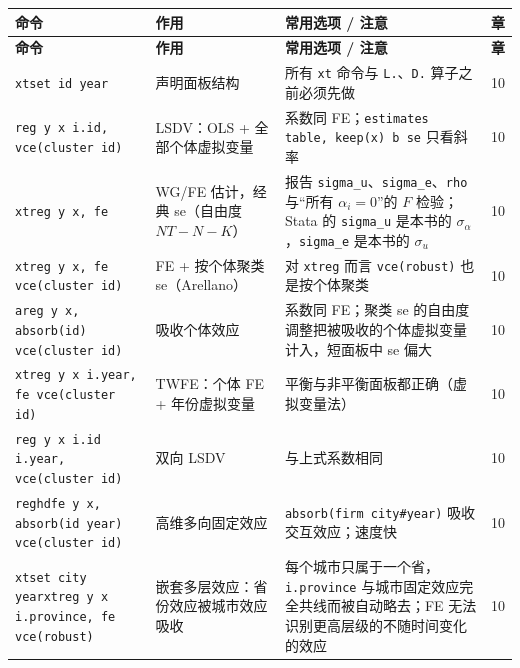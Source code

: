 {\renewcommand{\arraystretch}{1.12}\begin{longtable}{@{}>{\raggedright\arraybackslash\small}p{5.3cm}>{\raggedright\arraybackslash\small}p{3.8cm}>{\raggedright\arraybackslash\small}p{5.3cm}>{\centering\arraybackslash\small}p{0.9cm}@{}}
\toprule
\textbf{命令} & \textbf{作用} & \textbf{常用选项 / 注意} & \textbf{章}\\
\midrule
\endfirsthead
\toprule
\textbf{命令} & \textbf{作用} & \textbf{常用选项 / 注意} & \textbf{章}\\
\midrule
\endhead
\bottomrule
\endlastfoot

\texttt{xtset id year}\newline {\footnotesize\rmfamily [官方]} & 声明面板结构 & 所有 \texttt{xt} 命令与 \texttt{L.}、\texttt{D.} 算子之前必须先做 & 10\\
\addlinespace[1pt]
\texttt{reg y x i.id, vce(cluster id)} & LSDV：OLS + 全部个体虚拟变量 & 系数同 FE；\texttt{estimates table, keep(x) b se} 只看斜率 & 10\\
\addlinespace[1pt]
\texttt{xtreg y x, fe} & WG/FE 估计，经典 se（自由度 $NT-N-K$） & 报告 \texttt{sigma\_u}、\texttt{sigma\_e}、\texttt{rho} 与“所有 $\alpha_i=0$”的 $F$ 检验；Stata 的 \texttt{sigma\_u} 是本书的 $\sigma_\alpha$，\texttt{sigma\_e} 是本书的 $\sigma_u$ & 10\\
\addlinespace[1pt]
\texttt{xtreg y x, fe vce(cluster id)} & FE + 按个体聚类 se（Arellano） & 对 \texttt{xtreg} 而言 \texttt{vce(robust)} 也是按个体聚类 & 10\\
\addlinespace[1pt]
\texttt{areg y x, absorb(id) vce(cluster id)} & 吸收个体效应 & 系数同 FE；聚类 se 的自由度调整把被吸收的个体虚拟变量计入，短面板中 se 偏大 & 10\\
\addlinespace[1pt]
\texttt{xtreg y x i.year, fe vce(cluster id)} & TWFE：个体 FE + 年份虚拟变量 & 平衡与非平衡面板都正确（虚拟变量法） & 10\\
\addlinespace[1pt]
\texttt{reg y x i.id i.year, vce(cluster id)} & 双向 LSDV & 与上式系数相同 & 10\\
\addlinespace[1pt]
\texttt{reghdfe y x, absorb(id year) vce(cluster id)}\newline {\footnotesize\rmfamily [SSC]} & 高维多向固定效应 & \texttt{absorb(firm city\#year)} 吸收交互效应；速度快 & 10\\
\addlinespace[1pt]
\texttt{xtset city year}\newline \texttt{xtreg y x i.province, fe vce(robust)} & 嵌套多层效应：省份效应被城市效应吸收 & 每个城市只属于一个省，\texttt{i.province} 与城市固定效应完全共线而被自动略去；FE 无法识别更高层级的不随时间变化的效应 & 10\\
\end{longtable}}


